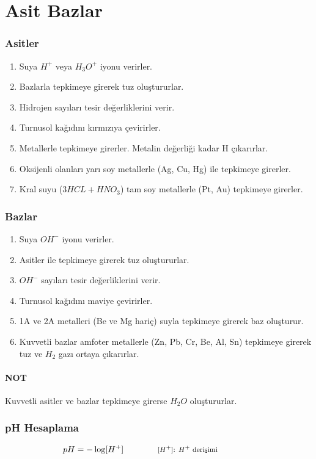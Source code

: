 \section{Asit Bazlar}

\subsubsection*{Asitler}
\begin{enumerate}
\item Suya $H^+$ veya $H_3O^+$ iyonu verirler.
\item Bazlarla tepkimeye girerek tuz oluştururlar.
\item Hidrojen sayıları tesir değerliklerini verir.
\item Turnusol kağıdını kırmızıya çevirirler.
\item Metallerle tepkimeye girerler. Metalin değerliği kadar H çıkarırlar.
\item Oksijenli olanları yarı soy metallerle (Ag, Cu, Hg) ile tepkimeye girerler.
\item Kral suyu ($3HCL + HNO_3$) tam soy metallerle (Pt, Au) tepkimeye girerler.
\end{enumerate}

\subsubsection*{Bazlar}
\begin{enumerate}
\item Suya $OH^-$ iyonu verirler.
\item Asitler ile tepkimeye girerek tuz oluştururlar.
\item $OH^-$ sayıları tesir değerliklerini verir.
\item Turnusol kağıdını maviye çevirirler.
\item 1A ve 2A metalleri (Be ve Mg hariç) suyla tepkimeye girerek baz oluşturur.
\item Kuvvetli bazlar amfoter metallerle (Zn, Pb, Cr, Be, Al, Sn) tepkimeye girerek tuz ve $H_2$ gazı ortaya çıkarırlar.
\end{enumerate}

\paragraph*{NOT}
Kuvvetli asitler ve bazlar tepkimeye girerse $H_2O$ oluştururlar.

\subsubsection*{pH Hesaplama}
\begin{equation}
    pH = -\log [H^+] \qquad \qquad \parbox{4cm}{\footnotesize$\begin{aligned}
        [H^+]\text{: $H^+$ derişimi }
\end{aligned}$}
\end{equation}
